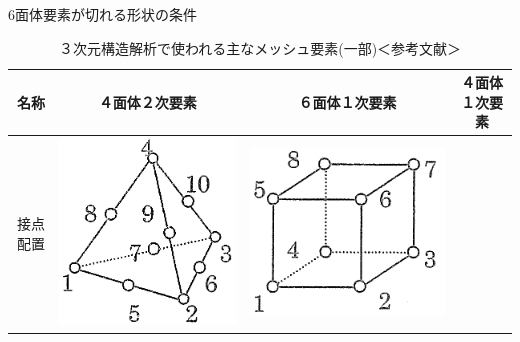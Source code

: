 \begin{frame}{6面体要素が切れる形状の条件}
  \begin{table}[hbtp]
      \caption{３次元構造解析で使われる主なメッシュ要素(一部)＜参考文献\cite{handbook}＞}
      \vspace{-5mm}
      \begin{tabular}{|r|c|c|c|} %
          \hline
          名称       & ４面体２次要素 & ６面体１次要素 & ４面体１次要素 \\
          \hline
          接点配置   & \includegraphics[keepaspectratio]{images/tet10.png}
                     & \includegraphics[keepaspectratio]{images/hex8.png} 

\end{tabular}
\end{table}
\end{frame}
